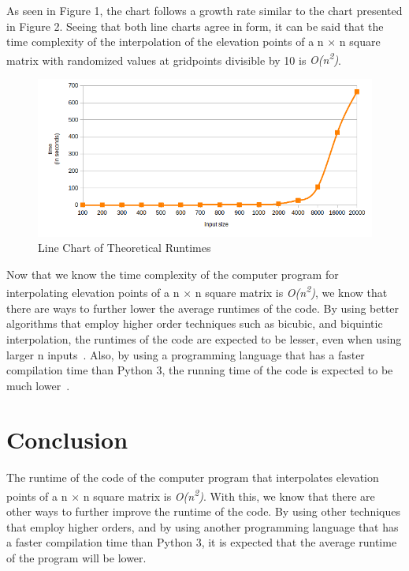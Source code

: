 \documentclass{article}
\begin{document}
\indent As seen in Figure 1, the chart follows a growth rate similar to the chart presented in Figure 2. Seeing that both line charts agree in form, it can be said that the time complexity of the interpolation of the elevation points of a n $\times$ n square matrix with randomized values at gridpoints divisible by 10 is \emph{O(n\textsuperscript{2})}. \\
\begin{figure}[H]
    \includegraphics[width=1\textwidth]{chart02.png}
    \centering
    \caption{Line Chart of Theoretical Runtimes}
    \end{figure}


\indent Now that we know the time complexity of the computer program for interpolating elevation points of a n $\times$ n square matrix is \emph{O(n\textsuperscript{2})}, we know that there are ways to further lower the average runtimes of the code. By using better algorithms that employ higher order techniques such as bicubic, and biquintic interpolation, the runtimes of the code are expected to be lesser, even when using larger n inputs~\cite{kidner}. Also, by using a programming language that has a faster compilation time than Python 3, the running time of the code is expected to be much lower~\cite{healthyjournal}.

\section*{Conclusion}
\hspace{\parindent} The runtime of the code of the computer program that interpolates elevation points of a n $\times$ n square matrix is \emph{O(n\textsuperscript{2})}. With this, we know that there are other ways to further improve the runtime of the code. By using other techniques that employ higher orders, and by using another programming language that has a faster compilation time than Python 3, it is expected that the average runtime of the program will be lower.
\end{document}

